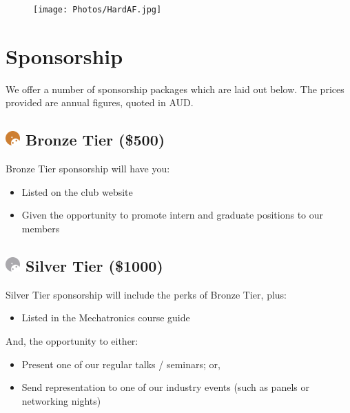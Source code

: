 \documentclass[a4paper,12pt]{report}
\begin{document}
\begin{figure}[H]
    \centering
    \texttt{[image: Photos/HardAF.jpg]}
\end{figure}

\newpage

\section*{Sponsorship}
\large
We offer a number of sponsorship packages which are laid out below. The prices provided are annual figures, quoted in AUD.
\normalsize

\subsection*{
    \includegraphics[width=1em]{../assets/Sponsor Icons/Bronze.png}
    \textcolor{sponsor_bronze}{Bronze Tier (\$500)}
}
Bronze Tier sponsorship will have you:
\begin{itemize}
    \item Listed on the club website
    \item Given the opportunity to promote intern and graduate positions to our members
\end{itemize}

\subsection*{
    \includegraphics[width=1em]{../assets/Sponsor Icons/Silver.png}
    \textcolor{sponsor_silver}{Silver Tier (\$1000)}
}
Silver Tier sponsorship will include the perks of Bronze Tier, plus:
\begin{itemize}
    \item Listed in the Mechatronics course guide
\end{itemize}
And, the opportunity to either:
\begin{itemize}
    \item Present one of our regular talks / seminars; or,
    \item Send representation to one of our industry events (such as panels or networking nights)
\end{itemize}
\end{document}
